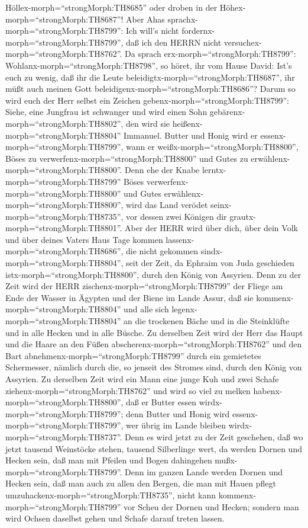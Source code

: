 Höllex-morph=``strongMorph:TH8685'' oder droben in der
Höhex-morph=``strongMorph:TH8687''!  Aber Ahas
sprachx-morph=``strongMorph:TH8799'': Ich will's nicht
fordernx-morph=``strongMorph:TH8799'', daß ich den HERRN nicht
versuchex-morph=``strongMorph:TH8762''.  Da sprach
erx-morph=``strongMorph:TH8799'': Wohlanx-morph=``strongMorph:TH8798'',
so höret, ihr vom Hause David: Ist's euch zu wenig, daß ihr die Leute
beleidigtx-morph=``strongMorph:TH8687'', ihr müßt auch meinen Gott
beleidigenx-morph=``strongMorph:TH8686''?  Darum so wird
euch der Herr selbst ein Zeichen gebenx-morph=``strongMorph:TH8799'':
Siehe, eine Jungfrau ist schwanger und wird einen Sohn
gebärenx-morph=``strongMorph:TH8802'', den wird sie
heißenx-morph=``strongMorph:TH8804'' Immanuel.  Butter und
Honig wird er essenx-morph=``strongMorph:TH8799'', wann er
weißx-morph=``strongMorph:TH8800'', Böses zu
verwerfenx-morph=``strongMorph:TH8800'' und Gutes zu
erwählenx-morph=``strongMorph:TH8800''.  Denn ehe der Knabe
lerntx-morph=``strongMorph:TH8799'' Böses
verwerfenx-morph=``strongMorph:TH8800'' und Gutes
erwählenx-morph=``strongMorph:TH8800'', wird das Land verödet
seinx-morph=``strongMorph:TH8735'', vor dessen zwei Königen dir
grautx-morph=``strongMorph:TH8801''.  Aber der HERR wird
über dich, über dein Volk und über deines Vaters Haus Tage kommen
lassenx-morph=``strongMorph:TH8686'', die nicht gekommen
sindx-morph=``strongMorph:TH8804'', seit der Zeit, da Ephraim von Juda
geschieden istx-morph=``strongMorph:TH8800'', durch den König von
Assyrien.  Denn zu der Zeit wird der HERR
zischenx-morph=``strongMorph:TH8799'' der Fliege am Ende der Wasser in
Ägypten und der Biene im Lande Assur,  daß sie
kommenx-morph=``strongMorph:TH8804'' und alle sich
legenx-morph=``strongMorph:TH8804'' an die trockenen Bäche und in die
Steinklüfte und in alle Hecken und in alle Büsche.  Zu
derselben Zeit wird der Herr das Haupt und die Haare an den Füßen
abscherenx-morph=``strongMorph:TH8762'' und den Bart
abnehmenx-morph=``strongMorph:TH8799'' durch ein gemietetes Schermesser,
nämlich durch die, so jenseit des Stromes sind, durch den König von
Assyrien.  Zu derselben Zeit wird ein Mann eine junge Kuh
und zwei Schafe ziehenx-morph=``strongMorph:TH8762''  und
wird so viel zu melken habenx-morph=``strongMorph:TH8800'', daß er
Butter essen wirdx-morph=``strongMorph:TH8799''; denn Butter und Honig
wird essenx-morph=``strongMorph:TH8799'', wer übrig im Lande bleiben
wirdx-morph=``strongMorph:TH8737''.  Denn es wird jetzt zu
der Zeit geschehen, daß wo jetzt tausend Weinstöcke stehen, tausend
Silberlinge wert, da werden Dornen und Hecken sein,  daß
man mit Pfeilen und Bogen dahingehen mußx-morph=``strongMorph:TH8799''.
Denn im ganzen Lande werden Dornen und Hecken sein,  daß
man auch zu allen den Bergen, die man mit Hauen pflegt
umzuhackenx-morph=``strongMorph:TH8735'', nicht kann
kommenx-morph=``strongMorph:TH8799'' vor Scheu der Dornen und Hecken;
sondern man wird Ochsen daselbst gehen und Schafe darauf treten lassen.

